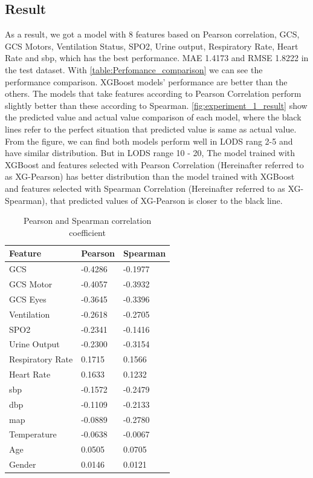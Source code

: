 \documentclass[12pt,a4paper,english
]{tunithesis}
\begin{document}
\subsection{Result}
As a result, we got a model with 8 features based on Pearson correlation, GCS, GCS Motors, Ventilation Status, SPO2, Urine output, Respiratory Rate, Heart Rate and sbp, which has the best performance. MAE 1.4173 and RMSE 1.8222 in the test dataset. With \ref{table:Perfomance_comparison} we can see the performance comparison. XGBoost models' performance are better than the others. The models that take features according to Pearson Correlation perform slightly better than these according to Spearman. \ref{fig:experiment_1_result} show the predicted value and actual value comparison of each model, where the black lines refer to the perfect situation that predicted value is same as actual value. From the figure, we can find both models perform well in LODS rang 2-5 and have similar distribution. But in LODS range 10 - 20, The model trained with XGBoost and features selected with Pearson Correlation (Hereinafter referred to as XG-Pearson) has better distribution than the model trained with XGBoost and features selected with Spearman Correlation (Hereinafter referred to as XG-Spearman), that predicted values of XG-Pearson is closer to the black line.

\begin{table}[]
\centering
    \caption{Pearson and Spearman correlation coefficient}
    \label{table:cc_value}
    \begin{tabular}{|l|l|l|}
        \hline
        \textbf{Feature} & \textbf{Pearson} & \textbf{Spearman} \\ \hline
            GCS & -0.4286 & -0.1977 \\ \hline
            GCS Motor & -0.4057 & -0.3932 \\ \hline
            GCS Eyes & -0.3645 & -0.3396 \\ \hline
            Ventilation & -0.2618 & -0.2705 \\ \hline
            SPO2 & -0.2341 & -0.1416 \\ \hline
            Urine Output & -0.2300 & -0.3154 \\ \hline
            Respiratory Rate & 0.1715 & 0.1566\\ \hline
            Heart Rate & 0.1633 & 0.1232 \\ \hline
            sbp & -0.1572 & -0.2479 \\ \hline
            dbp & -0.1109 & -0.2133 \\ \hline
            map & -0.0889 & -0.2780 \\ \hline
            Temperature & -0.0638 & -0.0067 \\ \hline
            Age & 0.0505 & 0.0705 \\ \hline
            Gender & 0.0146 & 0.0121 \\ \hline
    \end{tabular}
\end{table}
\end{document}
